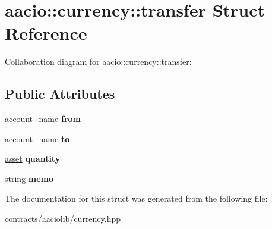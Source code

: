 \hypertarget{structaacio_1_1currency_1_1transfer}{}\section{aacio\+:\+:currency\+:\+:transfer Struct Reference}
\label{structaacio_1_1currency_1_1transfer}


Collaboration diagram for aacio\+:\+:currency\+:\+:transfer\+:
\subsection*{Public Attributes}
\begin{DoxyCompactItemize}
\item 
\mbox{\label{structaacio_1_1currency_1_1transfer_a0606b027ddbc10609f14676bad5dcec0}} 
\mbox{\hyperlink{structaacio_1_1chain_1_1name}{account\+\_\+name}} {\bfseries from}
\item 
\mbox{\label{structaacio_1_1currency_1_1transfer_a156ae7f55c133736acf31dd4488323cd}} 
\mbox{\hyperlink{structaacio_1_1chain_1_1name}{account\+\_\+name}} {\bfseries to}
\item 
\mbox{\label{structaacio_1_1currency_1_1transfer_a4a417ad8b478b6629fc7bb25ffadf122}} 
\mbox{\hyperlink{structaacio_1_1asset}{asset}} {\bfseries quantity}
\item 
\mbox{\label{structaacio_1_1currency_1_1transfer_acf3889805d4227b142bf6563cf4c718c}} 
string {\bfseries memo}
\end{DoxyCompactItemize}


The documentation for this struct was generated from the following file\+:\begin{DoxyCompactItemize}
\item 
contracts/aaciolib/currency.\+hpp\end{DoxyCompactItemize}
